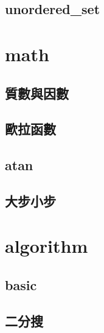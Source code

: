     \subsection{unordered\_set}
        
    

%         

\section{math}
    \subsection{質數與因數}
          
    \subsection{歐拉函數}
        
    \subsection{atan}
        
    \subsection{大步小步}
        
        
\section{algorithm}
    \subsection{basic}
        
    \subsection{二分搜}
        
